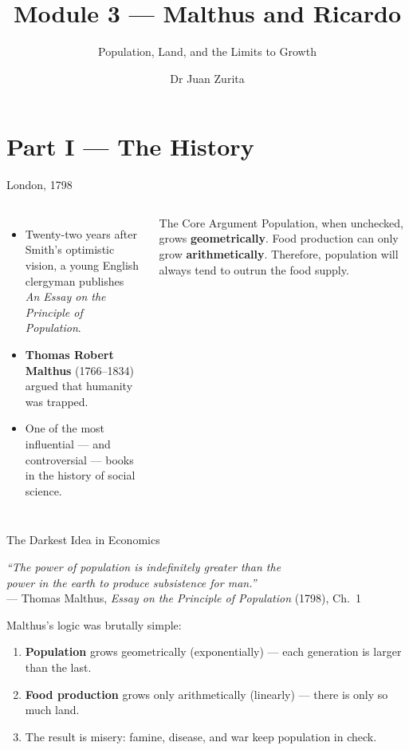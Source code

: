 \documentclass[aspectratio=169, 10pt]{beamer}
\title{Module 3 --- Malthus and Ricardo}
\subtitle{Population, Land, and the Limits to Growth}
\author{Dr Juan Zurita}
\institute{From Smith to Simulation\\
The University of Edinburgh~$\cdot$~School of Economics}
\date{}
\begin{document}
\maketitle

\section{Part I --- The History}

\begin{frame}{London, 1798}
\begin{columns}[T]
\begin{itemize}
  \item Twenty-two years after Smith's optimistic vision, a young
        English clergyman publishes\\
        \textit{An Essay on the Principle of Population}.
  \item \textbf{Thomas Robert Malthus} (1766--1834) argued
        that humanity was \alert{trapped}.
  \item One of the most influential --- and controversial --- books
        in the history of social science.
\end{itemize}
\begin{block}{The Core Argument}
  Population, when unchecked, grows \textbf{geometrically}.
  Food production can only grow \textbf{arithmetically}.
  Therefore, population will always tend to outrun the food supply.
\end{block}
\end{columns}
\end{frame}

\begin{frame}{The Darkest Idea in Economics}
\begin{center}
\textit{``The power of population is indefinitely greater than the\\
power in the earth to produce subsistence for man.''}\\[4pt]
--- Thomas Malthus, \textit{Essay on the Principle of Population} (1798), Ch.~1
\end{center}
\vspace{1em}
Malthus's logic was brutally simple:
\begin{enumerate}
  \item \textbf{Population} grows \alert{geometrically} (exponentially) ---
        each generation is larger than the last.
  \item \textbf{Food production} grows only \alert{arithmetically} (linearly) ---
        there is only so much land.
  \item The result is misery: famine, disease, and war keep population
        in check.
\end{enumerate}
\end{frame}
\end{document}
